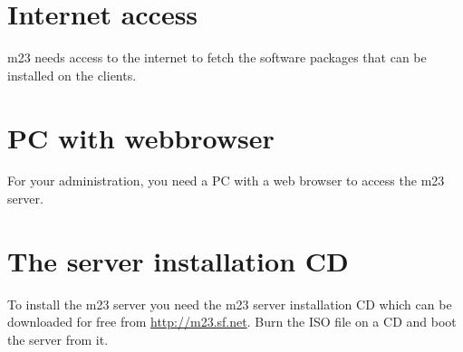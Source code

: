 \section{Internet access}
m23 needs access to the internet to fetch the software packages that can be installed on the clients.

\section{PC with webbrowser}
For your administration, you need a PC with a web browser to access the m23 server.

\section{The server installation CD}
To install the m23 server you need the m23 server installation CD which can be downloaded for free from  \underline{http://m23.sf.net}. Burn the ISO file on a CD and boot the server from it.
